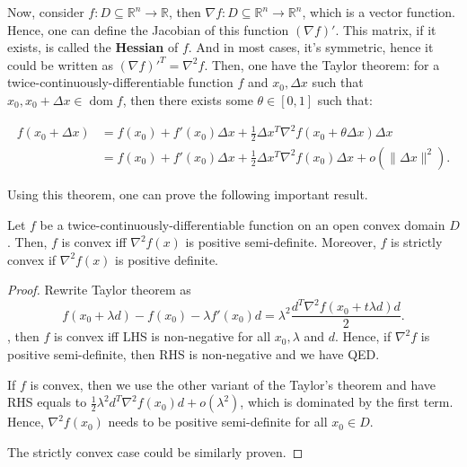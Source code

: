 Now, consider \( f: D \subseteq \mathbb{R}^{n} \to  \mathbb{R} \), then \(
\nabla f: D \subseteq \mathbb{R}^{n} \to  \mathbb{R}^{n} \), which is a vector
function. Hence, one can define the Jacobian of this function \( (\nabla f)' \).
This matrix, if it exists, is called the \textbf{Hessian} of \( f \). And in
most cases, it's symmetric, hence it could be written as \( (\nabla f)'^{T} =
\nabla ^2 f \). Then, one have the Taylor theorem: for a
twice-continuously-differentiable function \( f \) and \( x_{0}, \Delta x \)
such that \( x_{0}, x_{0} + \Delta x \in \operatorname{dom} f \), then there
exists some \( \theta \in [0, 1] \) such that:

\begin{align*}
  f(x_{0}+\Delta x) &= f(x_{0}) + f'(x_{0})\Delta x + \frac{1}{2} \Delta x^{T}
  \nabla ^2f(x_{0} + \theta \Delta x) \Delta x\\
&= f(x_{0}) + f'(x_{0})\Delta x + \frac{1}{2} \Delta x^{T}
  \nabla ^2f(x_{0}) \Delta x + o(\|\Delta x\|^2)
.\end{align*}

Using this theorem, one can prove the following important result.

\begin{theorem}
  Let \( f \) be a twice-continuously-differentiable function on an open convex
  domain \( D \). Then, \( f \) is convex iff \( \nabla ^2 f(x) \) is
  positive semi-definite. Moreover, \( f \) is strictly convex if \( \nabla ^2
  f(x) \) is positive definite.
\end{theorem}

\begin{proof}
  Rewrite Taylor theorem as
  \[
    f(x_{0}+\lambda d)-f(x_{0})-\lambda f'(x_{0})d =\lambda^{2}
    \frac{d^{T}\nabla^{2}f(x_{0} + t\lambda d)d}{2}
  .\], then \( f \) is convex iff LHS is non-negative for all \( x_{0}, \lambda
  \) and \( d \). Hence, if \( \nabla ^2 f \) is positive semi-definite, then
  RHS is non-negative and we have QED.

  If \( f \) is convex, then we use the other variant of the Taylor's theorem
  and have RHS equals to \( \frac{1}{2}\lambda ^2 d^{T}\nabla ^2 f(x_{0})d +
  o(\lambda ^2) \), which is dominated by the first term. Hence, \( \nabla ^2
  f(x_{0}) \) needs to be positive semi-definite for all \( x_{0} \in D \).

  The strictly convex case could be similarly proven.
\end{proof}

